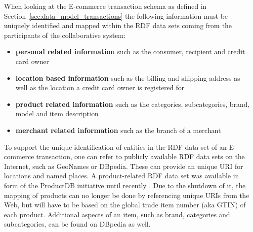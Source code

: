 

When looking at the \gls{E-commerce} transaction schema as defined in Section~\ref{sec:data_model_transactions} the following information must be uniquely identified and mapped within the \gls{RDF} data sets coming from the participants of the collaborative system: \@

\begin{itemize}
	\item \textbf{personal related information} such as the consumer, recipient and credit card owner
	\item \textbf{location based information} such as the billing and shipping address as well as the location a credit card owner is registered for
	\item \textbf{product related information} such as the categories, subcategories, brand, model and item description
	\item \textbf{merchant related information} such as the branch of a merchant
\end{itemize}

To support the unique identification of entities in the \gls{RDF} data set of an \gls{E-commerce} transaction, one can refer to publicly available \gls{RDF} data sets on the Internet, such as GeoNames or DBpedia. These can provide an unique \gls{URI} for locations and named places. A product-related \gls{RDF} data set was available in form of the ProductDB initiative until recently \citep{bouzidi2014product}. Due to the shutdown of it, the mapping of products can no longer be done by referencing unique \gls{URI}s from the Web, but will have to be based on the global trade item number (aka \gls{GTIN}) of each product. Additional aspects of an item, such as brand, categories and subcategories, can be found on DBpedia as well. \\

